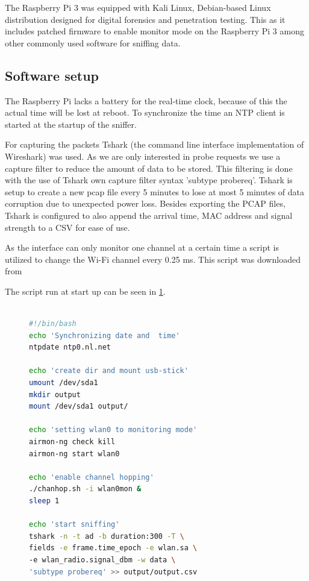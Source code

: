 \documentclass[conference,compsoc]{IEEEtran}
\begin{document}
The Raspberry Pi 3 was equipped with Kali Linux, Debian-based Linux distribution designed for digital forensics and penetration testing. This as it includes patched firmware to enable monitor mode on the Raspberry Pi 3 among other commonly used software for sniffing data.

\subsection{Software setup}
The Raspberry Pi lacks a battery for the real-time clock, because of this the actual time will be lost at reboot. To synchronize the time an NTP client is started at the startup of the sniffer.

For capturing the packets Tshark (the command line interface implementation of Wireshark) was used. As we are only interested in probe requests we use a capture filter to reduce the amount of data to be stored. This filtering is done with the use of Tshark own capture filter syntax 'subtype probereq'. Tshark is setup to create a new pcap file every 5 minutes to lose at most 5 minutes of data corruption due to unexpected power loss. Besides exporting the PCAP files, Tshark is configured to also append the arrival time, MAC address and signal strength to a CSV for ease of use. 

As the interface can only monitor one channel at a certain time a script is utilized to change the Wi-Fi channel every 0.25 ms. This script was downloaded from \cite{chanhop.sh}


The script run at start up can be seen in \ref{listing:startup}.

\begin{figure}[h!]
    \centering
\begin{lstlisting}[language=bash,caption={mac\_tracker.sh}]

#!/bin/bash
echo 'Synchronizing date and  time'
ntpdate ntp0.nl.net

echo 'create dir and mount usb-stick'  
umount /dev/sda1
mkdir output
mount /dev/sda1 output/

echo 'setting wlan0 to monitoring mode'
airmon-ng check kill
airmon-ng start wlan0

echo 'enable channel hopping'
./chanhop.sh -i wlan0mon &
sleep 1

echo 'start sniffing'
tshark -n -t ad -b duration:300 -T \
fields -e frame.time_epoch -e wlan.sa \
-e wlan_radio.signal_dbm -w data \
'subtype probereq' >> output/output.csv 
\end{lstlisting}
\label{listing:startup}
\end{figure}
\end{document}
